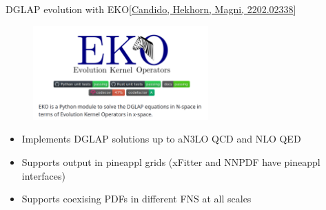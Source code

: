 \documentclass[aspectratio=43, 8pt,t]{beamer}
\begin{document}
\begin{frame}{DGLAP evolution with EKO}{\color{gray}\footnotesize [\hyperlink{https://arxiv.org/abs/2202.02338}{Candido, Hekhorn, Magni, 2202.02338}]}
  \begin{figure}
    \includegraphics[width=0.6\textwidth]{eko_header.png}
  \end{figure}
  \begin{itemize}
    \item Implements DGLAP solutions up to aN3LO QCD and NLO QED
    \item Supports output in pineappl grids (xFitter and NNPDF have pineappl interfaces)
    \item Supports coexising PDFs in different FNS at all scales
  \end{itemize}

\end{frame}
\end{document}
